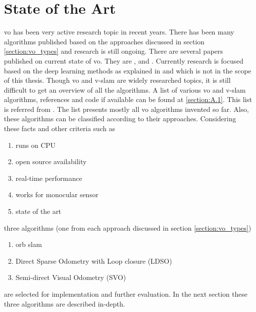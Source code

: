 \section{State of the Art}
\acrshort{vo} has been very active research topic in recent years. There has been many algorithms published based on the approaches discussed in section \ref{section:vo_types} and research is still ongoing. There are several papers published on current state of \acrshort{vo}. They are \cite{Aqel-et-al-2016}, \cite{KhalidYousif-et-al-2015} and \cite{ScaramuzzaVO}. Currently research is focused based on the deep learning methods as explained in \cite{7989236} and \cite{yang20d3vo} which is not in the scope of this thesis. Though \acrshort{vo} and \acrshort{v-slam} are widely researched topics, it is still difficult to get an overview of all the algorithms. A list of various \acrshort{vo} and \acrshort{v-slam} algorithms, references and code if available can be found at \ref{section:A.1}. This list is referred from \cite{chris}. The list presents mostly all \acrshort{vo} algorithms invented so far. Also, these algorithms can be classified according to their approaches. Considering these facts and other criteria such as
\begin{enumerate}
	\item runs on CPU 
	\item open source availability 
	\item real-time performance
	\item works for monocular sensor
	\item state of the art
\end{enumerate}	
three algorithms (one from each approach discussed in section \ref{section:vo_types})
\begin{enumerate}
    \item \acrshort{orb} \acrshort{slam} \cite{Mur-Artal} 
    \item Direct Sparse Odometry with Loop closure (LDSO)\cite{gao2018ldso} 
  	\item Semi-direct Visual Odometry (SVO) \cite{7782863} 
\end{enumerate}	     
are selected for implementation and further evaluation. In the next section these three algorithms are described in-depth. \\
